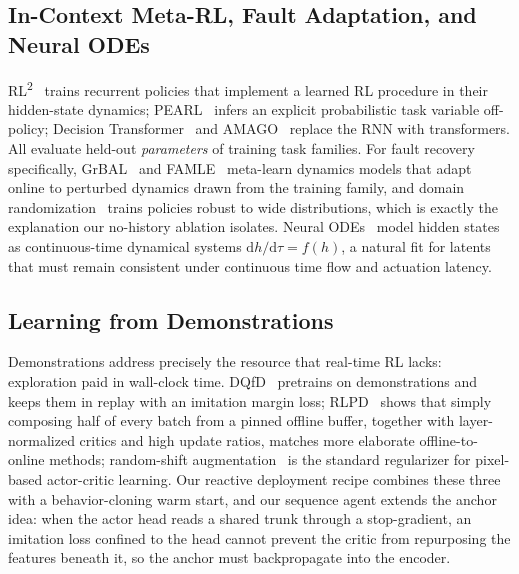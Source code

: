 \documentclass[conference]{IEEEtran}
\newcommand{\rltwo}{\texorpdfstring{RL\textsuperscript{2}}{RL2}}
\begin{document}
\subsection{In-Context Meta-RL, Fault Adaptation, and Neural ODEs}
\rltwo{}~\cite{rl2,wang2016learning} trains recurrent policies that implement a learned RL procedure in their hidden-state dynamics; PEARL~\cite{pearl} infers an explicit probabilistic task variable off-policy; Decision Transformer~\cite{decisiontransformer} and AMAGO~\cite{amago} replace the RNN with transformers. All evaluate held-out \emph{parameters} of training task families. For fault recovery specifically, GrBAL~\cite{grbal} and FAMLE~\cite{famle} meta-learn dynamics models that adapt online to perturbed dynamics drawn from the training family, and domain randomization~\cite{tobin2017domain} trains policies robust to wide distributions, which is exactly the explanation our no-history ablation isolates. Neural ODEs~\cite{neuralode} model hidden states as continuous-time dynamical systems $\mathrm{d}h/\mathrm{d}\tau = f(h)$, a natural fit for latents that must remain consistent under continuous time flow and actuation latency.

\subsection{Learning from Demonstrations}
Demonstrations address precisely the resource that real-time RL lacks: exploration paid in wall-clock time. DQfD~\cite{dqfd} pretrains on demonstrations and keeps them in replay with an imitation margin loss; RLPD~\cite{rlpd} shows that simply composing half of every batch from a pinned offline buffer, together with layer-normalized critics and high update ratios, matches more elaborate offline-to-online methods; random-shift augmentation~\cite{drq} is the standard regularizer for pixel-based actor-critic learning. Our reactive deployment recipe combines these three with a behavior-cloning warm start, and our sequence agent extends the anchor idea: when the actor head reads a shared trunk through a stop-gradient, an imitation loss confined to the head cannot prevent the critic from repurposing the features beneath it, so the anchor must backpropagate into the encoder.
\end{document}

